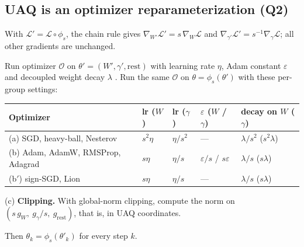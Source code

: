 \documentclass[11pt]{article}
\begin{document}
\subsection{UAQ is an optimizer reparameterization (Q2)}\label{sec:reparam}

\begin{lemma}[Gradients]\label{lem:gradients}
With $\mathcal L'=\mathcal L\circ\phi_s$, the chain rule gives $\nabla_{W'}\mathcal L'=s\,\nabla_W\mathcal L$ and $\nabla_{\gamma'}\mathcal L'=s^{-1}\nabla_\gamma\mathcal L$; all other gradients are unchanged.
\end{lemma}

\begin{theorem}\label{thm:reparam}
Run optimizer $\mathcal O$ on $\theta'=(W',\gamma',\mathrm{rest})$ with learning rate $\eta$, Adam constant $\varepsilon$ and decoupled weight decay $\lambda$ \citep{kingma2015adam,loshchilov2019adamw}. Run the same $\mathcal O$ on $\theta=\phi_s(\theta')$ with these per-group settings:
\begin{center}\small
\begin{tabularx}{\linewidth}{@{}L l l l l@{}}
\toprule
Optimizer & lr ($W$) & lr ($\gamma$) & $\varepsilon$ ($W$ / $\gamma$) & decay on $W$ ($\gamma$)\\
\midrule
(a) SGD, heavy-ball, Nesterov & $s^2\eta$ & $\eta/s^2$ & --- & $\lambda/s^2$ ($s^2\lambda$)\\
(b) Adam, AdamW, RMSProp, Adagrad & $s\eta$ & $\eta/s$ & $\varepsilon/s$ / $s\varepsilon$ & $\lambda/s$ ($s\lambda$)\\
(b$'$) sign-SGD, Lion & $s\eta$ & $\eta/s$ & --- & $\lambda/s$ ($s\lambda$)\\
\bottomrule
\end{tabularx}
\end{center}
(c) \textbf{Clipping.} With global-norm clipping, compute the norm on $(s\,g_W,\ g_\gamma/s,\ g_{\mathrm{rest}})$, that is, in UAQ coordinates.

Then $\theta_k=\phi_s(\theta'_k)$ for every step $k$.
\end{theorem}
\end{document}
